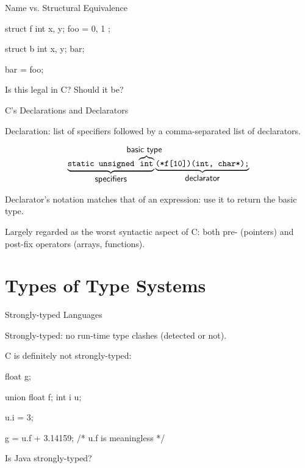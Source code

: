 \documentclass{plt}
\begin{document}
\begin{frame}[fragile]{Name vs. Structural Equivalence}

\begin{C}
struct f {
  int x, y;
} foo = { 0, 1 };

struct b {
  int x, y;
} bar;

bar = foo;
\end{C}

Is this legal in C?  Should it be?


\end{frame}

\begin{frame}{C's Declarations and Declarators}

Declaration: list of specifiers followed by a comma-separated list of
declarators.

\[\underbrace{\texttt{static unsigned
  $\overbrace{\texttt{int}}^{\hbox to 0pt{\hss
        \textsf{basic type} \hss}}$}}_{\textsf{\normalsize  specifiers}}
  \underbrace{\texttt{(*f[10])(int, char*);}}_{\textsf{\normalsize declarator}}
\]

Declarator's notation matches that of an expression: use it to return
the basic type.

Largely regarded as the worst syntactic aspect of C: both pre-
(pointers) and post-fix operators (arrays, functions).

\end{frame}

\part{Types of Type Systems}

\begin{frame}[fragile]{Strongly-typed Languages}

Strongly-typed: no run-time type clashes (detected or not).

C is definitely not strongly-typed:

\begin{C}
float g;

union { float f; int i } u;

u.i = 3;

g = u.f + 3.14159; /* u.f is meaningless */
\end{C}

Is Java strongly-typed?

\end{frame}
\end{document}
